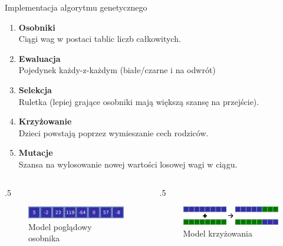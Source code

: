 \begin{frame}{Implementacja algorytmu genetycznego}
    \begin{enumerate}
        \item \textbf{Osobniki} \\
        {\small Ciągi wag w postaci tablic liczb całkowitych.}
        \item \textbf{Ewaluacja} \\
        {\small Pojedynek każdy-z-każdym (białe/czarne i na odwrót)}
        \item \textbf{Selekcja} \\
        {\small Ruletka (lepiej grające osobniki mają większą szansę na przejście).}
        \item \textbf{Krzyżowanie} \\
        {\small Dzieci powstają poprzez wymieszanie cech rodziców.}
        \item \textbf{Mutacje} \\
        {\small Szansa na wylosowanie nowej wartości losowej wagi w ciągu.}
    \end{enumerate}

    \begin{columns}
		\begin{column}{.5\hsize}
			{\centering
			\begin{figure}
				\includegraphics[width=5cm]{figures/genetyk_osobnik.png}
				\caption{Model poglądowy osobnika}
			\end{figure}
			}
		\end{column}
		\begin{column}{.5\hsize}
			{\centering
			\begin{figure}
				\includegraphics[width=5cm]{figures/genetyk_krzyzowanie.png}
				\caption{Model krzyżowania}
			\end{figure}
			}
		\end{column}
	\end{columns}
\end{frame}
